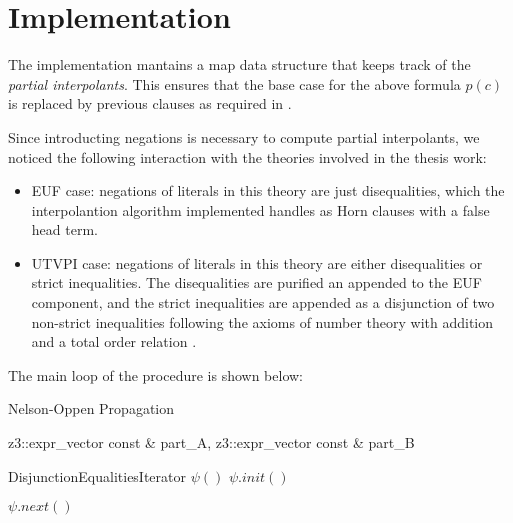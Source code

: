 \section{Implementation}

The implementation mantains a map data structure that 
keeps track of the \emph{partial interpolants}. This ensures
that the base case for the above formula $p(c)$ is replaced
by previous clauses as required in \cite{10.1007/11532231_26}.

Since introducting negations is necessary to compute partial interpolants,
we noticed the following interaction with the theories involved in the
thesis work:

\begin{itemize}
  \item EUF case: negations of literals in this theory are just
    disequalities, which the interpolantion algorithm implemented
    handles as Horn clauses with a false head term.
  \item UTVPI case: negations of literals in this theory are either
    disequalities or strict inequalities. The disequalities are purified
    an appended to the EUF component, and the strict inequalities are 
    appended as a disjunction of two non-strict inequalities following
    the axioms of number theory with addition and a total order relation
    \cite{DBLP:books/daglib/0076838}.
\end{itemize}

The main loop of the procedure is shown below:

\begin{algorithm}
  \caption{ Nelson-Oppen Propagation }
  \linespread{\separationline}\selectfont
  \begin{algorithmic}[2]
     { 
      z3::expr\_vector const \& part\_A, 
      z3::expr\_vector const \& part\_B 
  }


    \State DisjunctionEqualitiesIterator $\psi()$
    \State $\psi.init()$

    \EndIf
    \EndIf


    \Else
    \EndIf

    \Else

    \Else
    \EndIf

    \EndIf

    \State $\psi.next()$

    \EndWhile

    \EndProcedure
  \end{algorithmic}
\end{algorithm}


